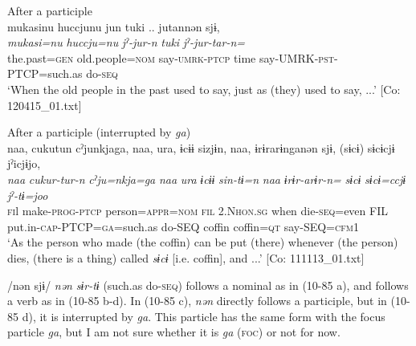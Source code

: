   \ex After a participle\\
      \glll    mukasinu  huccjunu  jun  tuki ..   jutannən  sjɨ,\\
    \textit{mukasi=nu}  \textit{huccju=nu}  \textit{jˀ-jur-n}  \textit{tuki} {} \textit{jˀ-jur-tar-n=}  \textit{}\\
    the.past=\textsc{gen}  old.people=\textsc{nom}  say-\textsc{umrk}-\textsc{ptcp}  time {} say-UMRK-\textsc{pst}-PTCP=such.as  do-\textsc{seq}\\
\glt     ‘When the old people in the past used to say, just as (they) used to say, ...’  [Co: 120415\_01.txt]

  \ex After a participle (interrupted by \textit{ga})\\
      \glll    naa,  cukutun  cˀjunkjaga,  naa,  ura,  ɨcɨɨ  sizjɨn,  naa,  ɨrɨrarɨnganən  sjɨ,  (sɨcɨ)  sɨcɨcjɨ  jˀicjɨjo,\\                                                                                                                                                                                                      
    \textit{naa}  \textit{cukur-tur-n}  \textit{cˀju=nkja=ga}  \textit{naa}  \textit{ura}  \textit{ɨcɨɨ} \textit{sin-tɨ=n}  \textit{naa}  \textit{ɨrɨr-arɨr-n=}  \textit{}  \textit{sɨcɨ} \textit{sɨcɨ=ccjɨ}  \textit{jˀ-tɨ=joo}\\                                                                                                                                                                                                      
    \textsc{fi}l  make-\textsc{prog}-\textsc{ptcp}  person=\textsc{appr}=\textsc{nom}  \textsc{fil}  2.N\textsc{hon}.\textsc{sg}  when   die-\textsc{seq}=even  FIL  put.in-\textsc{cap}-PTCP=\textsc{ga}=such.as  do-SEQ  coffin  coffin=\textsc{qt}  say-SEQ=\textsc{cfm}1\\
    \glt ‘As the person who made (the coffin) can be put (there) whenever (the person) dies, (there is a thing) called \textit{sɨcɨ} [i.e. coffin], and ...’ [Co: 111113\_01.txt]
    \z
\z

/nən sjɨ/ \textit{nən} \textit{sɨr-tɨ} (such.as do-\textsc{seq}) follows a nominal as in (10-85 a), and follows a verb as in (10-85 b-d). In (10-85 c), \textit{nən} directly follows a participle, but in (10-85 d), it is interrupted by \textit{ga}. This particle has the same form with the focus particle \textit{ga}, but I am not sure whether it is \textit{ga} (\textsc{foc}) or not for now.

